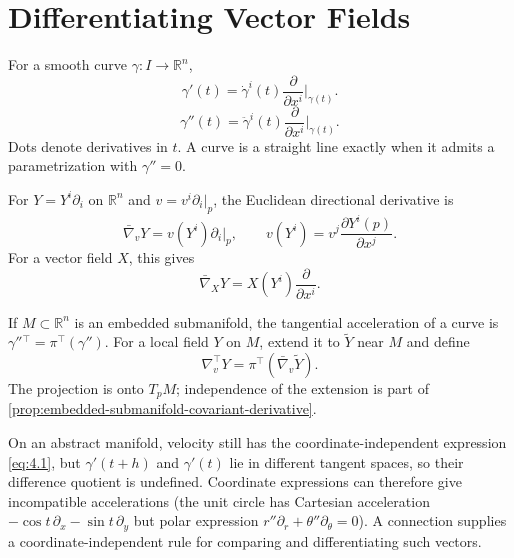 
\section{Differentiating Vector Fields}

For a smooth curve $\gamma:I\to\mathbb R^n$,
\begin{equation}
\gamma'(t)=\dot\gamma^i(t)\frac{\partial}{\partial x^i}\bigg|_{\gamma(t)}.
\label{eq:4.1}
\end{equation}
\begin{equation}
\gamma''(t)=\ddot\gamma^i(t)\frac{\partial}{\partial x^i}\bigg|_{\gamma(t)}.
\label{eq:4.2}
\end{equation}
Dots denote derivatives in $t$. A curve is a straight line exactly when it admits a parametrization with $\gamma''=0$.

For $Y=Y^i\partial_i$ on $\mathbb R^n$ and $v=v^i\partial_i|_p$, the Euclidean directional derivative is
\[
\bar\nabla_vY=v(Y^i)\partial_i|_p,
\qquad v(Y^i)=v^j\frac{\partial Y^i(p)}{\partial x^j}.
\]
For a vector field $X$, this gives
\begin{equation}
\bar\nabla_XY=X(Y^i)\frac{\partial}{\partial x^i}.\tag{4.3}
\end{equation}

If $M\subset\mathbb R^n$ is an embedded submanifold, the tangential acceleration of a curve is $\gamma''{}^\top=\pi^\top(\gamma'')$. For a local field $Y$ on $M$, extend it to $\widetilde Y$ near $M$ and define
\begin{equation}
\nabla_v^\top Y=\pi^\top(\bar\nabla_v\widetilde Y).\tag{4.4}
\end{equation}
The projection is onto $T_pM$; independence of the extension is part of
\cref{prop:embedded-submanifold-covariant-derivative}.

On an abstract manifold, velocity still has the coordinate-independent expression \eqref{eq:4.1}, but $\gamma'(t+h)$ and $\gamma'(t)$ lie in different tangent spaces, so their difference quotient is undefined. Coordinate expressions can therefore give incompatible accelerations (the unit circle has Cartesian acceleration $-\cos t\,\partial_x-\sin t\,\partial_y$ but polar expression $r''\partial_r+\theta''\partial_\theta=0$). A connection supplies a coordinate-independent rule for comparing and differentiating such vectors.


